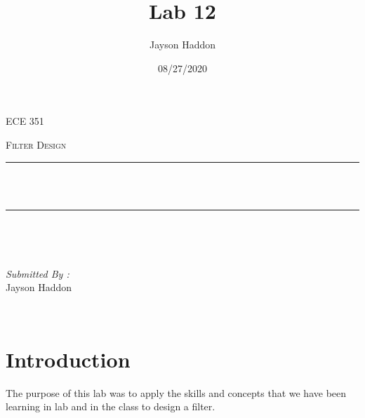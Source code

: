 \documentclass[11pt,a4]{report}
\title{Lab 12}
\author{Jayson Haddon}
\date{08/27/2020}
\makeatletter
\let\thetitle\@title
\makeatother
\begin{document}

\begin{titlepage}
	\centering
    \vspace*{0.5 cm}
\begin{center}    \textsc{\Large   ECE 351 }\\[2.0 cm]	\end{center}%
	\textsc{\Large Filter Design  }\\[0.5 cm]				%
	\rule{\linewidth}{0.2 mm} \\[0.4 cm]
	{ \huge \bfseries \thetitle}\\
	\rule{\linewidth}{0.2 mm} \\[1.5 cm]
	
	\begin{minipage}{0.4\textwidth}
		\begin{flushleft} \large
			\end{flushleft}
			\end{minipage}~
			\begin{minipage}{0.4\textwidth}
            
			\begin{flushright} \large
			\emph{Submitted By :} \\
			Jayson Haddon  
		\end{flushright}
           
	\end{minipage}\\[2 cm]
	
    
    
    
    
	
\end{titlepage}

\tableofcontents
\pagebreak

\renewcommand{\thesection}{\arabic{section}}
\section{Introduction}
The purpose of this lab was to apply the skills and concepts that we have been learning in lab and in the class to design a filter.
\end{document}
